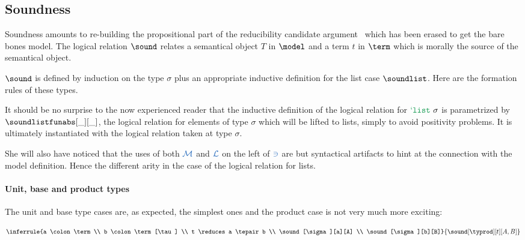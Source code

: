 \documentclass[preprint]{sigplanconf}
\begin{document}
\subsection{Soundness}

Soundness amounts to re-building the propositional part of the reducibility
candidate argument~\cite{Girard06} which has been erased to get the bare bones
model. The logical relation $\sound$ relates a semantical object $T$ in $\model$
and a term $t$ in $\term$ which is morally the source of the semantical object.

\begin{definition}$\sound$ is defined by
induction on the type $\sigma$ plus an appropriate inductive definition for
the list case $\soundlist$. Here are the formation rules of these types.


\begin{remark}
It should be no surprise to the now experienced reader that the inductive
definition of the logical relation for $\tylist$ is parametrized by
$\soundlistfunabs[\_][\_]$, the logical relation for elements of type
$\sigma$ which will be lifted to lists, simply to avoid positivity problems.
It is ultimately instantiated with the logical relation taken at type
$\sigma$.

She will also have noticed that the uses of both $\color{NavyBlue}{\mathcal{M}}$
and $\color{NavyBlue}{\mathcal{L}}$ on the left of $\color{NavyBlue}{\ni}$ are
but syntactical artifacts to hint at the connection with the model definition.
Hence the different arity in the case of the logical relation for lists.
\end{remark}

\paragraph{Unit, base and product types} The unit and base type cases are, as
expected, the simplest ones and the product case is not very much more exciting:
$$\inferrule{a \colon \term \\ b \colon \term[\tau] \\ t \reduces a \tepair b
\\ \sound[\sigma][a][A] \\ \sound[\sigma][b][B]}{\sound[\typrod][t][A , B]}$$


\end{definition}
\end{document}
